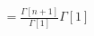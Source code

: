 \documentclass[preview]{standalone}
\begin{document}
\begin{align*}
= \frac{\Gamma[n+1]}{\Gamma[1]} \Gamma[1]
\end{align*}
\end{document}

